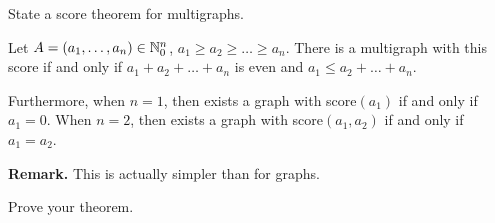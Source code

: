 
\begin{exercise}
  State a score theorem for multigraphs. %
  \begin{theorem}
     Let $A = (a_1,\dots,a_n) \in \mathbb{N}_0^n$, $a_1 \geq a_2 \geq \dots  \geq a_n$. There is a multigraph
      with this score if and only if $a_1 + a_2 + \dots + a_n$ is even and $a_1 \leq a_2 + \dots + a_n$.

     Furthermore, when $n=1$, then exists a graph with score$(a_1)$ if and only if $a_1=0$.
     When $n=2$, then exists a graph with score$(a_1, a_2)$ if and only if $a_1=a_2$.
  \end{theorem}
  
  
  \textbf{Remark.} This is actually
  simpler than for graphs.
\end{exercise}

\begin{exercise}
  Prove your theorem.
\end{exercise}

